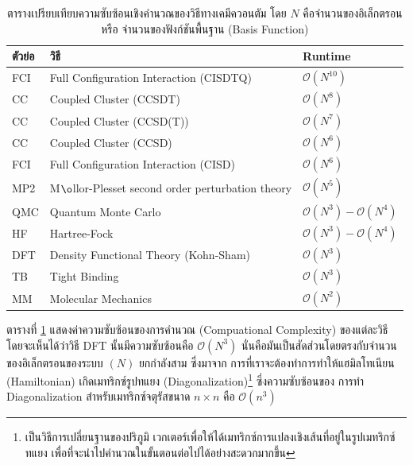 \begin{table}[htbp]
    \centering
    \caption{ตารางเปรียบเทียบความซับซ้อนเชิงคำนวณของวิธีทางเคมีควอนตัม\autocite{rupp2015} โดย $N$ คือจำนวนของอิเล็กตรอนหรือ%
    จำนวนของฟังก์ชันพื้นฐาน (Basis Function)}
    \label{tab:qm_complx}
    \small
    \begin{tabular}{lll}\toprule
    \textbf{ตัวย่อ} &\textbf{วิธี} &\textbf{Runtime} \\\midrule
    FCI &Full Configuration Interaction (CISDTQ) &$\mathcal{O}(N^{10})$ \\
    CC &Coupled Cluster (CCSDT) &$\mathcal{O}(N^{8})$ \\
    CC &Coupled Cluster (CCSD(T)) &$\mathcal{O}(N^{7})$ \\
    CC &Coupled Cluster (CCSD) &$\mathcal{O}(N^{6})$ \\
    FCI &Full Configuration Interaction (CISD) &$\mathcal{O}(N^{6})$ \\
    MP2 &M$\o$llor-Plesset second order perturbation theory &$\mathcal{O}(N^{5})$ \\
    QMC &Quantum Monte Carlo &$\mathcal{O}(N^{3}) - \mathcal{O}(N^{4})$ \\
    HF &Hartree-Fock &$\mathcal{O}(N^{3}) - \mathcal{O}(N^{4})$ \\
    DFT &Density Functional Theory (Kohn-Sham) &$\mathcal{O}(N^{3})$ \\
    TB &Tight Binding &$\mathcal{O}(N^{3})$ \\
    MM &Molecular Mechanics &$\mathcal{O}(N^{2})$ \\
    \bottomrule
    \end{tabular}
\end{table}

ตารางที่ \ref{tab:qm_complx} แสดงค่าความซับซ้อนของการคำนวณ (Compuational Complexity) ของแต่ละวิธี โดยจะเห็นได้ว่าวิธี DFT 
นั้นมีความซับซ้อนคือ $\mathcal{O}(N^{3})$ นั่นคือมันเป็นสัดส่วนโดยตรงกับจำนวนของอิเล็กตรอนของระบบ $(N)$ ยกกำลังสาม ซึ่งมาจาก%
การที่เราจะต้องทำการทำให้แฮมิลโทเนียน (Hamiltonian) เกิดเมทริกซ์รูปทแยง (Diagonalization)\footnote{เป็นวิธีการเปลี่ยนฐานของปริภูมิ%
เวกเตอร์เพื่อให้ได้เมทริกซ์การแปลงเชิงเส้นที่อยู่ในรูปเมทริกซ์ทแยง เพื่อที่จะนำไปคำนวณในขั้นตอนต่อไปได้อย่างสะดวกมากขึ้น} ซึ่งความซับซ้อนของ%
การทำ Diagonalization สำหรับเมทริกซ์จตุรัสขนาด $n \times n$ คือ $\mathcal{O}(n^{3})$

